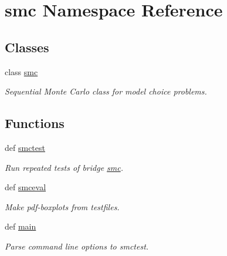 \hypertarget{namespacesmc}{
\section{smc Namespace Reference}
\label{namespacesmc}
}
\subsection*{Classes}
\begin{CompactItemize}
\item 
class \hyperlink{classsmc_1_1smc}{smc}
\begin{CompactList}\small\item\em Sequential Monte Carlo class for model choice problems. \item\end{CompactList}\end{CompactItemize}
\subsection*{Functions}
\begin{CompactItemize}
\item 
def \hyperlink{namespacesmc_90ae893d3420c53ca98ea6d16a27ebf6}{smctest}
\begin{CompactList}\small\item\em Run repeated tests of bridge \hyperlink{namespacesmc}{smc}. \item\end{CompactList}\item 
def \hyperlink{namespacesmc_e7960431b019652bb6041acbe319314a}{smceval}
\begin{CompactList}\small\item\em Make pdf-boxplots from testfiles. \item\end{CompactList}\item 
def \hyperlink{namespacesmc_060a055567983af558dd15bda3d5a7be}{main}
\begin{CompactList}\small\item\em Parse command line options to smctest. \item\end{CompactList}\end{CompactItemize}
